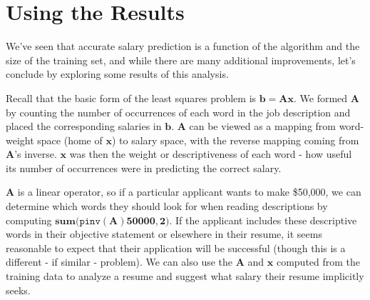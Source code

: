 \documentclass[12pt]{article}
\begin{document}
\section{Using the Results}
We've seen that accurate salary prediction is a function of the algorithm and the size of the training set, and while there are many additional improvements, let's conclude by exploring some results of this analysis.

Recall that the basic form of the least squares problem is $\bm{b = Ax}$.  We
formed $\bm{A}$ by counting the number of occurrences of each word in the job
description and placed the corresponding salaries in $\bm{b}$.  $\bm{A}$ can be
viewed as a mapping from word-weight space (home of $\bm{x}$) to salary space,
with the reverse mapping coming from $\bm{A}$'s inverse.  $\bm{x}$ was then the
weight or descriptiveness of each word - how useful its number of occurrences
were in predicting the correct salary.

$\bm{A}$ is a linear operator, so if a particular applicant wants to make
\$50,000, we can determine which words they should look for when reading
descriptions by computing $\bm{sum(}\texttt{pinv}\bm{(A)50000,2)}$.
If the
applicant includes these descriptive words in their objective statement or
elsewhere in their resume, it seems reasonable to expect that their application
will be successful (though this is a different - if similar - problem).  We can
also use the $\bm{A}$ and $\bm{x}$ computed from the training data to analyze a
resume and suggest what salary their resume implicitly seeks.

    \begin{center} 
        
\end{center}
\end{document}
